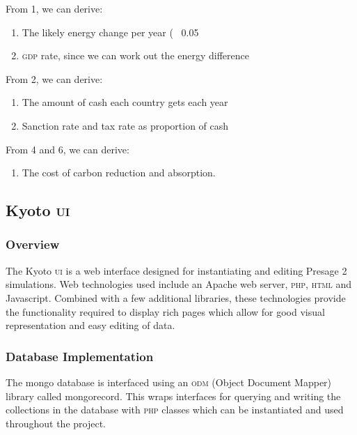 From 1, we can derive: 

\begin{enumerate}[resume]
\item The likely energy change per year (~ 0.05%
\item \textsc{gdp} rate, since we can work out the energy difference
\end{enumerate}

From 2, we can derive:

\begin{enumerate}[resume]
\item The amount of cash each country gets each year
\item Sanction rate and tax rate as proportion of cash
\end{enumerate}

From 4 and 6, we can derive:

\begin{enumerate}[resume]
\item The cost of carbon reduction and absorption.
\end{enumerate}

\subsection{Kyoto \textsc{ui}}

\subsubsection{Overview}

The Kyoto \textsc{ui} is a web interface designed for instantiating and editing Presage 2 simulations. Web technologies used include an Apache web server, \textsc{php}, \textsc{html} and Javascript. Combined with a few additional libraries, these technologies provide the functionality required to display rich pages which allow for good visual representation and easy editing of data.

\subsubsection{Database Implementation}

The mongo database is interfaced using an \textsc{odm} (Object Document Mapper) library called mongorecord. This wraps interfaces for querying and writing the collections in the database with \textsc{php} classes which can be instantiated and used throughout the project.

